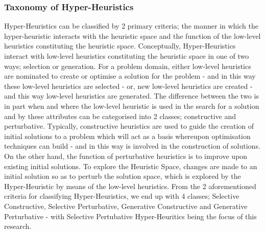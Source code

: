 \documentclass[a4paper,12pt]{article}
\begin{document}
        \subsubsection{Taxonomy of Hyper-Heuristics}
            \par{
                \noindent 
                Hyper-Heuristics can be classified by 2 primary criteria; the manner in which
                the hyper-heuristic interacts with the heuristic space and the function of the
                low-level heuristics constituting the heuristic space.\newline 
                \newline 
                Conceptually, Hyper-Heuristics interact with low-level heuristics constituting the
                heuristic space in one of two ways; selection or generation.\newline 
                \newline 
                \cite{hhsoa}For a problem domain, either low-level heuristics are nominated to
                create or optimise a solution for the problem - and in this way these low-level
                heuristics are selected - or, new low-level heuristics are created - and this way
                low-level heuristics are generated.
                The difference between the two is in part when and where the low-level heuristic
                is used in the search for a solution and by these attributes can be categorised
                into 2 classes; constructive and perturbative.\newline 
                \newline 
                Typically, constructive heuristics are used to guide the creation of initial solutions
                to a problem which will act as a basis whereupon optimisation techniques
                can build - and in this way is involved in the construction of solutions.
                On the other hand, the function of perturbative heuristics is to improve upon
                existing initial solutions. To explore the Heuristic Space, changes are made to
                an initial solution so as to perturb the solution space, which is explored by the
                Hyper-Heuristic by means of the low-level heuristics.\newline 
                \newline 
                From the 2 aforementioned criteria for classifying Hyper-Heuristics, we end
                up with 4 classes; Selective Constructive, Selective Perturbative, Generative
                Constructive and Generative Perturbative - with Selective Pertubative Hyper-Heuritics being 
                the focus of this research.
            }
\end{document}
